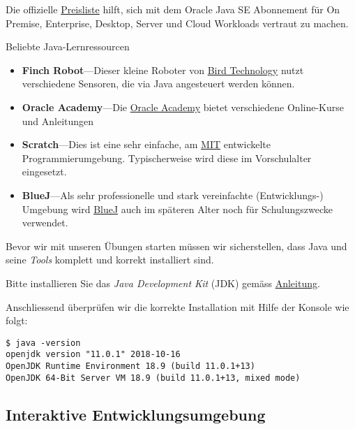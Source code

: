 Die offizielle \href{https://www.oracle.com/corporate/pricing/#java-se}
{Preisliste} hilft, sich mit dem Oracle Java SE Abonnement für On Premise, 
Enterprise, Desktop, Server und Cloud Workloads vertraut zu machen.


\begin{frame}{Beliebte Java-Lernressourcen}
	\begin{itemize}
		\item\textbf{Finch Robot}---Dieser kleine Roboter von 
		\href{https://www.birdbraintechnologies.com/finch/}
		{Bird Technology} nutzt verschiedene Sensoren,
		die via Java angesteuert werden können.
		\item\textbf{Oracle Academy}---Die 
		\href{https://academy.oracle.com/en/training-self-study.html}
		{Oracle Academy} bietet verschiedene 
		Online-Kurse und Anleitungen
		\item\textbf{Scratch}---Dies ist eine sehr einfache, am
		\href{https://scratch.mit.edu/}{MIT} entwickelte Programmierumgebung.
		Typischerweise wird diese im Vorschulalter eingesetzt. 
		\item\textbf{BlueJ}---Als sehr professionelle und stark vereinfachte
		(Entwicklungs-) Umgebung wird \href{http://www.bluej.org/}{BlueJ} 
		auch im späteren Alter noch für Schulungszwecke verwendet.
	\end{itemize}
\end{frame}
	
\begin{Exercise}[%
	title={Installation der Software},
	label={ex:installation}]
	
	Bevor wir mit unseren Übungen starten müssen wir sicherstellen, dass Java und
	seine {\em Tools} komplett und korrekt installiert sind.
	
	Bitte installieren Sie das {\em Java Development Kit} (JDK) gemäss 
	\href{https://jdk.java.net/11/}{Anleitung}.
	
	Anschliessend überprüfen wir die korrekte Installation mit Hilfe der Konsole wie folgt:
	
\begin{verbatim}
$ java -version
openjdk version "11.0.1" 2018-10-16
OpenJDK Runtime Environment 18.9 (build 11.0.1+13)
OpenJDK 64-Bit Server VM 18.9 (build 11.0.1+13, mixed mode)
\end{verbatim}
	
\end{Exercise}	

\subsection{Interaktive Entwicklungsumgebung}

